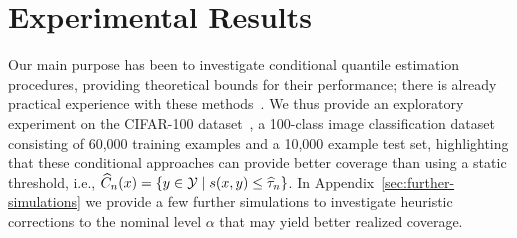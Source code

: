 \documentclass{article}
\newcommand{\radphi}{b_{\phi}}
\newcommand{\scorefunc}{s}
\newcommand{\scoreval}{\scorefunc}
\newcommand{\scorerv}{S}
\begin{document}

\section{Experimental Results}

Our main purpose has been to investigate conditional quantile estimation
procedures, providing theoretical bounds for their performance; there is
already practical experience with these methods~\cite{GibbsChCa23}.
%
We thus provide an
exploratory experiment on the CIFAR-100
dataset~\cite{KrizhevskyHi09}, a 100-class image classification dataset
consisting of 60,000 training examples and a 10,000 example test set,
highlighting that these conditional approaches can provide better
coverage than using a static threshold, i.e.,
$\what{C}_n(x) = \{y \in \mc{Y} \mid \scoreval(x, y) \le \what{\tau}_n\}$.
%
In Appendix~\ref{sec:further-simulations} we provide a few further
simulations to investigate heuristic corrections to the nominal level
$\alpha$ that may yield better realized coverage.
\end{document}
